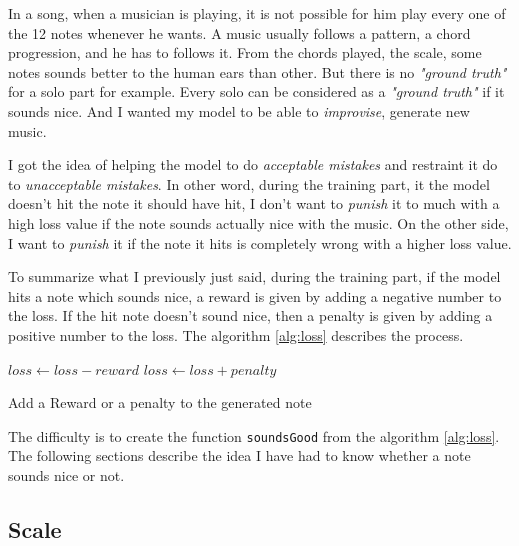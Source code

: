 \documentclass[12pt]{report}
\begin{document}
In a song, when a musician is playing, it is not possible for him play every one of the 12 notes whenever he wants.
A music usually follows a pattern, a chord progression, and he has to follows it.
From the chords played, the scale, some notes sounds better to the human ears than other.
But there is no \textit{"ground truth"} for a solo part for example.
Every solo can be considered as a \textit{"ground truth"} if it sounds nice.
And I wanted my model to be able to \textit{improvise}, generate new music.

I got the idea of helping the model to do \textit{acceptable mistakes} and restraint it do to \textit{unacceptable mistakes}.
In other word, during the training part, it the model doesn't hit the note it should have hit, I don't want to \textit{punish} it to much with a high loss value if the note sounds actually nice with the music.
On the other side, I want to \textit{punish} it if the note it hits is completely wrong with a higher loss value.

To summarize what I previously just said, during the training part, if the model hits a note which sounds nice, a reward is given by adding a negative number to the loss.
If the hit note doesn't sound nice, then a penalty is given by adding a positive number to the loss.
The algorithm \ref{alg:loss} describes the process.

\begin{algorithm}
    \begin{algorithmic}[1]
        \Statex
                \State $loss \gets loss - reward$
            \Else
                \State $loss \gets loss + penalty$
            \EndIf
            \State {}
        \EndFunction
    \end{algorithmic}
    \caption{Add a Reward or a penalty to the generated note}
    \label{alg:loss}
\end{algorithm}

The difficulty is to create the function \texttt{soundsGood} from the algorithm \ref{alg:loss}.
The following sections describe the idea I have had to know whether a note sounds nice or not.

\subsection{Scale}
\label{sec:scale}
\end{document}

